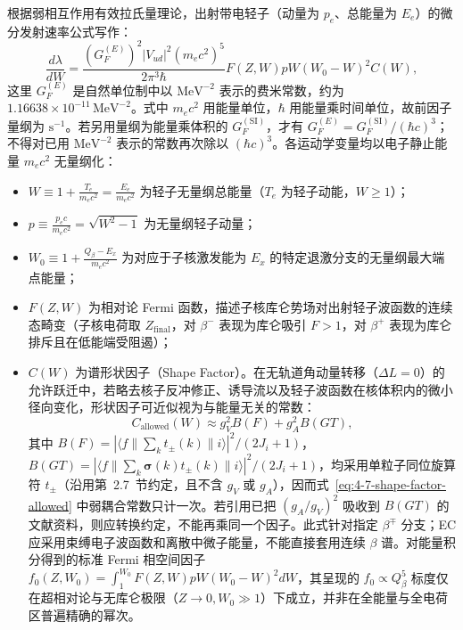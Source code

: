 根据弱相互作用有效拉氏量理论，出射带电轻子（动量为 $p_e$、总能量为 $E_e$）的微分发射速率公式写作：
\begin{equation}\label{eq:4-7-differential-spectrum}
\frac{d\lambda}{dW} = \frac{(G_F^{(E)})^2 |V_{ud}|^2 (m_e c^2)^5}{2\pi^3 \hbar} F(Z, W) p W (W_0 - W)^2 C(W),
\end{equation}
这里 $G_F^{(E)}$ 是自然单位制中以 $\mathrm{MeV}^{-2}$ 表示的费米常数，约为 $1.16638\times10^{-11}\,\mathrm{MeV}^{-2}$。式中 $m_e c^2$ 用能量单位，$\hbar$ 用能量乘时间单位，故前因子量纲为 $\mathrm{s}^{-1}$。若另用量纲为能量乘体积的 $G_F^{(\mathrm{SI})}$，才有 $G_F^{(E)}=G_F^{(\mathrm{SI})}/(\hbar c)^3$；不得对已用 $\mathrm{MeV}^{-2}$ 表示的常数再次除以 $(\hbar c)^3$。各运动学变量均以电子静止能量 $m_e c^2$ 无量纲化：
\begin{itemize}
\item $W \equiv 1 + \frac{T_e}{m_e c^2} = \frac{E_e}{m_e c^2}$ 为轻子无量纲总能量（$T_e$ 为轻子动能，$W \ge 1$）；
\item $p \equiv \frac{p_e c}{m_e c^2} = \sqrt{W^2 - 1}$ 为无量纲轻子动量；
\item $W_0 \equiv 1 + \frac{Q_\beta - E_x}{m_e c^2}$ 为对应于子核激发能为 $E_x$ 的特定退激分支的无量纲最大端点能量；
\item $F(Z, W)$ 为相对论 Fermi 函数，描述子核库仑势场对出射轻子波函数的连续态畸变（子核电荷取 $Z_{\mathrm{final}}$，对 $\beta^-$ 表现为库仑吸引 $F > 1$，对 $\beta^+$ 表现为库仑排斥且在低能端受阻遏）；
\item $C(W)$ 为谱形状因子（Shape Factor）。在无轨道角动量转移（$\Delta L = 0$）的允许跃迁中，若略去核子反冲修正、诱导流以及轻子波函数在核体积内的微小径向变化，形状因子可近似视为与能量无关的常数：
\begin{equation}\label{eq:4-7-shape-factor-allowed}
C_{\mathrm{allowed}}(W) \approx g_V^2 B(F) + g_A^2 B(GT),
\end{equation}
其中 $B(F) = |\langle f \| \sum_k t_\pm(k) \| i \rangle|^2 / (2J_i + 1)$，$B(GT) = |\langle f \| \sum_k \boldsymbol{\sigma}(k) t_\pm(k) \| i \rangle|^2 / (2J_i + 1)$，均采用单粒子同位旋算符 $t_\pm$（沿用第~2.7~节约定，且不含 $g_V$ 或 $g_A$），因而式~\eqref{eq:4-7-shape-factor-allowed} 中弱耦合常数只计一次。若引用已把 $(g_A/g_V)^2$ 吸收到 $B(GT)$ 的文献资料，则应转换约定，不能再乘同一个因子。此式针对指定 $\beta^\mp$ 分支；EC 应采用束缚电子波函数和离散中微子能量，不能直接套用连续 $\beta$ 谱。对能量积分得到的标准 Fermi 相空间因子 $f_0(Z, W_0) = \int_1^{W_0} F(Z, W) p W (W_0 - W)^2 dW$，其呈现的 $f_0 \propto Q_\beta^5$ 标度仅在超相对论与无库仑极限（$Z \to 0, W_0 \gg 1$）下成立，并非在全能量与全电荷区普遍精确的幂次。
\end{itemize}

